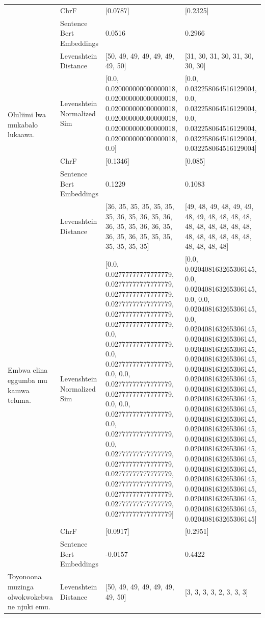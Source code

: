 \begin{tabular}{llll}
 & ChrF & [0.0787] & [0.2325] \\
 & Sentence Bert Embeddings & 0.0516 & 0.2966 \\
\cline{1-4}
\multirow[t]{4}{*}{Oluliimi lwa mukabalo lukaawa.} & Levenshtein Distance & [50, 49, 49, 49, 49, 49, 49, 50] & [31, 30, 31, 30, 31, 30, 30, 30] \\
 & Levenshtein Normalized Sim & [0.0, 0.020000000000000018, 0.020000000000000018, 0.020000000000000018, 0.020000000000000018, 0.020000000000000018, 0.020000000000000018, 0.0] & [0.0, 0.032258064516129004, 0.0, 0.032258064516129004, 0.0, 0.032258064516129004, 0.032258064516129004, 0.032258064516129004] \\
 & ChrF & [0.1346] & [0.085] \\
 & Sentence Bert Embeddings & 0.1229 & 0.1083 \\
\cline{1-4}
\multirow[t]{4}{*}{Embwa elina eggumba mu kamwa teluma.} & Levenshtein Distance & [36, 35, 35, 35, 35, 35, 35, 36, 35, 36, 35, 36, 36, 35, 35, 36, 36, 35, 36, 35, 36, 35, 35, 35, 35, 35, 35, 35] & [49, 48, 49, 48, 49, 49, 48, 49, 48, 48, 48, 48, 48, 48, 48, 48, 48, 48, 48, 48, 48, 48, 48, 48, 48, 48, 48, 48] \\
 & Levenshtein Normalized Sim & [0.0, 0.02777777777777779, 0.02777777777777779, 0.02777777777777779, 0.02777777777777779, 0.02777777777777779, 0.02777777777777779, 0.0, 0.02777777777777779, 0.0, 0.02777777777777779, 0.0, 0.0, 0.02777777777777779, 0.02777777777777779, 0.0, 0.0, 0.02777777777777779, 0.0, 0.02777777777777779, 0.0, 0.02777777777777779, 0.02777777777777779, 0.02777777777777779, 0.02777777777777779, 0.02777777777777779, 0.02777777777777779, 0.02777777777777779] & [0.0, 0.020408163265306145, 0.0, 0.020408163265306145, 0.0, 0.0, 0.020408163265306145, 0.0, 0.020408163265306145, 0.020408163265306145, 0.020408163265306145, 0.020408163265306145, 0.020408163265306145, 0.020408163265306145, 0.020408163265306145, 0.020408163265306145, 0.020408163265306145, 0.020408163265306145, 0.020408163265306145, 0.020408163265306145, 0.020408163265306145, 0.020408163265306145, 0.020408163265306145, 0.020408163265306145, 0.020408163265306145, 0.020408163265306145, 0.020408163265306145, 0.020408163265306145] \\
 & ChrF & [0.0917] & [0.2951] \\
 & Sentence Bert Embeddings & -0.0157 & 0.4422 \\
\cline{1-4}
\multirow[t]{4}{*}{Toyonoona muzinga olwokwokebwa ne njuki emu.} & Levenshtein Distance & [50, 49, 49, 49, 49, 49, 49, 50] & [3, 3, 3, 3, 2, 3, 3, 3] \\

\end{tabular}
